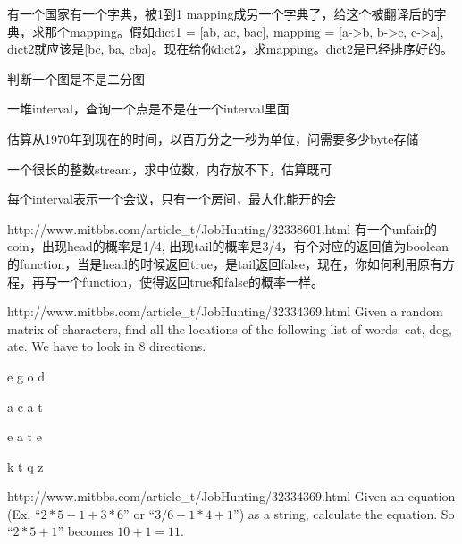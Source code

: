 \documentclass[a4paper]{article}
\begin{document}
\begin{CJK}{UTF8}{gbsn}
\begin{enumerate}
\begin{Q}[Google]{}
有一个国家有一个字典，被1到1 mapping成另一个字典了，给这个被翻译后的字典，求那个mapping。假如dict1 = [ab, ac, bac], mapping = [a->b, b->c, c->a], dict2就应该是[bc, ba, cba]。现在给你dict2，求mapping。dict2是已经排序好的。
\end{Q}

\begin{Q}[Google]{}
判断一个图是不是二分图
\end{Q}

\begin{Q}[Google]{}
一堆interval，查询一个点是不是在一个interval里面
\end{Q}

\begin{Q}[Google]{}
估算从1970年到现在的时间，以百万分之一秒为单位，问需要多少byte存储
\end{Q}

\begin{Q}[Google]{}
一个很长的整数stream，求中位数，内存放不下，估算既可
\end{Q}

\begin{Q}[Google]{}
每个interval表示一个会议，只有一个房间，最大化能开的会
\end{Q}

\begin{Q}[Groupon]{http://www.mitbbs.com/article_t/JobHunting/32338601.html}
有一个unfair的coin，出现head的概率是1/4, 出现tail的概率是3/4，有个对应的返回值为boolean的function，当是head的时候返回true，是tail返回false，现在，你如何利用原有方程，再写一个function，使得返回true和false的概率一样。
\end{Q}

\begin{Q}[Microsoft]{http://www.mitbbs.com/article_t/JobHunting/32334369.html}
Given a random matrix of characters, find all the locations of the following list of words: cat, dog, ate. We have to look in 8 directions.

e g o d

a c a t

e a t e

k t q z
\end{Q}

\begin{Q}[Microsoft]{http://www.mitbbs.com/article_t/JobHunting/32334369.html}
Given an equation (Ex. ``$2*5+1+3*6$'' or ``$3/6-1*4+1$'') as a string, calculate the equation. So ``$2*5+1$'' becomes $10+1=11$.
\end{Q}


\end{enumerate}
\end{CJK}
\end{document}
